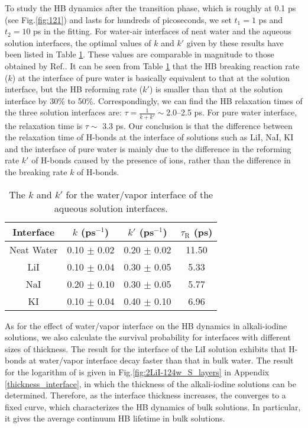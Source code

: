 To study the HB dynamics after the transition phase, which is roughly at 0.1 ps (see Fig.\thinspace\ref{fig:121}) and lasts for hundreds of picoseconds, 
we set $t_1 = 1$ ps and $t_2 = 10$ ps in the fitting.
For water-air interfaces of neat water and the aqueous solution interfaces, 
the optimal values of $k$ and $k'$ given by these results have been listed in Table \ref{tab:k_k_prime_pure_and_solutions}. 
These values are comparable in magnitude to those obtained by Ref.. 
It can be seen from Table \ref{tab:k_k_prime_pure_and_solutions} that the HB breaking reaction rate ($k$) at the interface of pure water is basically equivalent to 
that at the solution interface, but the HB reforming rate ($k'$) is smaller than that at the solution interface by 30\% to 50\%.
Correspondingly, we can find the HB relaxation times of the three solution interfaces are: $\tau=\frac{1}{k+k'} \sim $2.0--2.5 ps. 
For pure water interface, the relaxation time is $\tau \sim $ 3.3 ps. 
Our conclusion is that the difference between the relaxation time of H-bonds at the interface of solutions such as LiI, NaI, KI 
and the interface of pure water is mainly due to the difference in the reforming rate $k'$ of H-bonds caused by the presence of ions,
rather than the difference in the breaking rate $k$ of H-bonds.
%
\begin{table}[htbp]
\centering
\caption{\label{tab:k_k_prime_pure_and_solutions} 
    The $k$ and $k'$ for the water/vapor interface of the aqueous solution interfaces.} 
\begin{tabular}{cccc}
 Interface & $k$ (ps$^{-1}$) & $k'$ (ps$^{-1}$) & $\tau_{\text{R}}$ (ps) \\
\hline
  Neat Water & 0.10 $\pm$ 0.02 & 0.20 $\pm$ 0.02 & 11.50 \\
  LiI & 0.10 $\pm$ 0.04 & 0.30 $\pm$ 0.05 & 5.33 \\
  NaI & 0.20 $\pm$ 0.10 & 0.30 $\pm$ 0.05 & 5.77 \\
  KI  & 0.10 $\pm$ 0.04 & 0.40 $\pm$ 0.10 & 6.96 
\end{tabular}
\end{table}
As for the effect of water/vapor interface on the HB dynamics in alkali-iodine solutions,
we also calculate the survival probability for interfaces with different sizes of thickness. 
The result for the interface of the LiI solution exhibits that H-bonds at water/vapor interface decay faster than that in bulk water.
The result for the logarithm of \SHB is given in Fig.\space\ref{fig:2LiI-124w_S_layers} in Appendix \ref{thickness_interface}, 
in which the thickness of the alkali-iodine solutions can be determined.
Therefore, as the interface thickness increases, the \SHB converges to a fixed curve, 
which characterizes the HB dynamics of bulk solutions. 
In particular, it gives the average continuum HB lifetime in bulk solutions.
